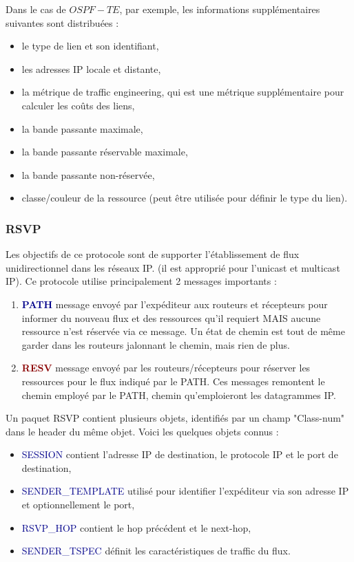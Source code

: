 \documentclass{article}
\newcommand{\dred}[1]{\textcolor{darkred}{\textbf{#1}}}
\newcommand{\dblu}[1]{\textcolor{darkblue}{\textbf{#1}}}
\newcommand{\blu}[1]{\textcolor{darkblue}{#1}}
\begin{document}
\begin{sffamily}
Dans le cas de $OSPF-TE$, par exemple, les informations supplémentaires suivantes sont distribuées :
\begin{itemize}
\item le type de lien et son identifiant,
\item les adresses IP locale et distante,
\item la métrique de traffic engineering, qui est une métrique supplémentaire pour calculer les coûts des liens,
\item la bande passante maximale, 
\item la bande passante réservable maximale,
\item la bande passante non-réservée,
\item classe/couleur de la ressource (peut être utilisée pour définir le type du lien).
\end{itemize}

\subsubsection{RSVP}

Les objectifs de ce protocole sont de supporter l'établissement de flux unidirectionnel dans les réseaux IP. (il est approprié 
pour l'unicast et multicast IP). Ce protocole utilise principalement 2 messages importants :
\begin{enumerate}
\item \dblu{PATH} message envoyé par l'expéditeur aux routeurs et récepteurs pour informer du nouveau flux et des ressources 
qu'il requiert MAIS aucune ressource n'est réservée via ce message. Un état de chemin est tout de même garder dans les routeurs 
jalonnant le chemin, mais rien de plus.
\item \dred{RESV} message envoyé par les routeurs/récepteurs pour réserver les ressources pour le flux indiqué par le PATH. Ces 
messages remontent le chemin employé par le PATH, chemin qu'emploieront les datagrammes IP.
\end{enumerate}

Un paquet RSVP contient plusieurs objets, identifiés par un champ "Class-num" dans le header du même objet. Voici les quelques 
objets connus :
\begin{itemize}
\item \blu{SESSION} contient l'adresse IP de destination, le protocole IP et le port de destination,
\item \blu{SENDER\_TEMPLATE} utilisé pour identifier l'expéditeur via son adresse IP et optionnellement le port,
\item \blu{RSVP\_HOP} contient le hop précédent et le next-hop,
\item \blu{SENDER\_TSPEC} définit les caractéristiques de traffic du flux.
\end{itemize}


\end{sffamily}
\end{document}
